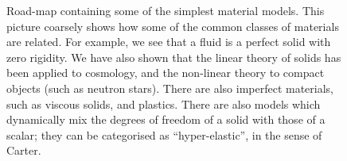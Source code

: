 \begin{figure}[!t]
\begin{centering}
\caption{Road-map containing some of the simplest material models. This picture coarsely shows how some of the common classes of materials are related. For example, we see that a fluid is a perfect solid with zero rigidity. We have also shown that the linear theory of solids has been applied to cosmology, and the non-linear theory to compact objects (such as neutron stars). There are also imperfect materials, such as viscous solids, and plastics. There are also models which dynamically mix the degrees of freedom of a solid with those of a scalar; they can be categorised as ``hyper-elastic'', in the sense of Carter.}\label{fig:shem_roadmap}
\end{centering}
\end{figure}
 